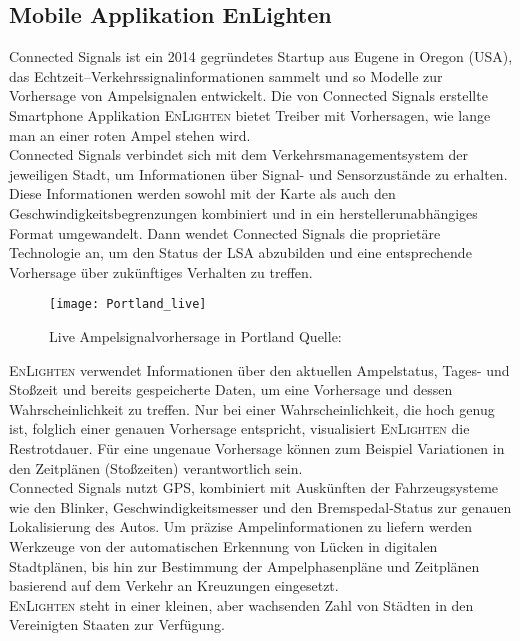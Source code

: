 \subsection*{Mobile Applikation EnLighten}
Connected Signals ist ein 2014 gegründetes Startup aus Eugene in Oregon (USA), das Echtzeit--Verkehrssignalinformationen sammelt und so Modelle zur Vorhersage von Ampelsignalen entwickelt. Die von Connected Signals erstellte Smartphone Applikation \textsc{EnLighten} bietet Treiber mit Vorhersagen, wie lange man an einer roten Ampel stehen wird. \cite{connectedSignals} \\
Connected Signals verbindet sich mit dem Verkehrsmanagementsystem der jeweiligen Stadt, um Informationen über Signal- und Sensorzustände zu erhalten. Diese Informationen werden sowohl mit der Karte als auch den Geschwindigkeitsbegrenzungen kombiniert und in ein herstellerunabhängiges Format umgewandelt. Dann wendet Connected Signals die proprietäre Technologie an, um den Status der \gls{LSA} abzubilden und eine entsprechende Vorhersage über zukünftiges Verhalten zu treffen. \cite{signals} 
\begin{figure}[t]
    \centering
    \texttt{[image: Portland\_live]} 
    \grayRule
    \label{fig:enlighten}
    \caption[Connected Signals live Vorhersage]{Live Ampelsignalvorhersage in Portland Quelle: \cite{signals}}
\end{figure}
\textsc{EnLighten} verwendet Informationen über den aktuellen Ampelstatus, Tages- und Stoßzeit und bereits gespeicherte Daten, um eine Vorhersage und dessen Wahrscheinlichkeit zu treffen. Nur bei einer Wahrscheinlichkeit, die hoch genug ist, folglich einer genauen Vorhersage entspricht, visualisiert \textsc{EnLighten} die Restrotdauer. Für eine ungenaue Vorhersage können zum Beispiel Variationen in den Zeitplänen (Stoßzeiten) verantwortlich sein.\\  
Connected Signals nutzt \gls{GPS}, kombiniert mit Auskünften der Fahrzeugsysteme wie den Blinker, Geschwindigkeitsmesser und den Bremspedal-Status zur genauen Lokalisierung des Autos. Um präzise Ampelinformationen zu liefern werden Werkzeuge von der automatischen Erkennung von Lücken in digitalen Stadtplänen, bis hin zur Bestimmung der Ampelphasenpläne und Zeitplänen basierend auf dem Verkehr an Kreuzungen eingesetzt. \cite{EnLighten} \\
\textsc{EnLighten} steht in einer kleinen, aber wachsenden Zahl von Städten in den Vereinigten Staaten zur Verfügung. 
